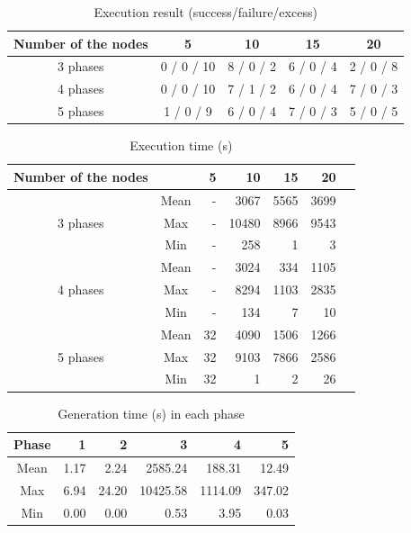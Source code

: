 \documentclass{article}
\begin{document}
\begin{table}[htbp]
\caption {Execution result (success/failure/excess)}
\label{tbl:result1}
\begin{tabular}{c|cccc}
    Number of the nodes &5&10&15&20\\
    \hline \hline
    3 phases &0 / 0 / 10&8 / 0 / 2&6 / 0 / 4&2 / 0 / 8\\
    4 phases &0 / 0 / 10&7 / 1 / 2&6 / 0 / 4&7 / 0 / 3\\
    5 phases &1 / 0 / 9&6 / 0 / 4&7 / 0 / 3&5 / 0 / 5\\
    \hline
\end{tabular}
\end{table}
\begin{table}[htbp]
\caption {Execution time (s)}
\label{tbl:result2}
\begin{tabular}{c|crrrrr}
    Number of the nodes & & 5& 10& 15& 20\\
    \hline \hline
            & Mean & -&  3067& 5565& 3699\\
    3 phases& Max  & -& 10480& 8966& 9543\\
            & Min  & -&   258&    1& 3\\
    \hline
            & Mean & -& 3024&  334& 1105\\
    4 phases& Max  & -& 8294& 1103& 2835\\
            & Min  & -& 134&     7&   10\\
    \hline
            & Mean & 32& 4090& 1506& 1266\\
    5 phases& Max  & 32& 9103& 7866& 2586\\
            & Min  & 32&    1&    2& 26\\
    \hline
\end{tabular}
\end{table}
\begin{table}[htbp]
\caption {Generation time (s) in each phase}
\label{tbl:result3}
\begin{tabular}{c|rrrrr}
    Phase &1&2&3&4&5\\
    \hline
    \hline
    Mean &1.17&2.24&2585.24&188.31&12.49\\
    Max &6.94&24.20&10425.58&1114.09&347.02\\
    Min &0.00&0.00&0.53&3.95&0.03\\
    \hline
\end{tabular}
\end{table}
\end{document}
